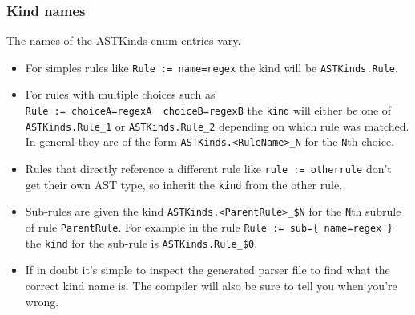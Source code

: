 \subsubsection{Kind names}\label{kind-names}

The names of the ASTKinds enum entries vary.

\begin{itemize}
\item
  For simples rules like
  \texttt{Rule\ :=\ name=\textquotesingle{}regex\textquotesingle{}} the
  kind will be \texttt{ASTKinds.Rule}.
\item
  For rules with multiple choices such as
  \texttt{Rule\ :=\ choiceA=\textquotesingle{}regexA\textquotesingle{}\ \textbar{}\ choiceB=\textquotesingle{}regexB\textquotesingle{}}
  the \texttt{kind} will either be one of \texttt{ASTKinds.Rule\_1} or
  \texttt{ASTKinds.Rule\_2} depending on which rule was matched. In
  general they are of the form
  \texttt{ASTKinds.\textless{}RuleName\textgreater{}\_N} for the
  \texttt{N}th choice.
\item
  Rules that directly reference a different rule like
  \texttt{rule\ :=\ otherrule} don't get their own AST type, so inherit
  the \texttt{kind} from the other rule.
\item
  Sub-rules are given the kind
  \texttt{ASTKinds.\textless{}ParentRule\textgreater{}\_\$N} for the
  \texttt{N}th subrule of rule \texttt{ParentRule}. For example in the
  rule
  \texttt{Rule\ :=\ sub=\{\ name=\textquotesingle{}regex\textquotesingle{}\ \}}
  the \texttt{kind} for the sub-rule is \texttt{ASTKinds.Rule\_\$0}.
\item
  If in doubt it's simple to inspect the generated parser file to find
  what the correct kind name is. The compiler will also be sure to tell
  you when you're wrong.
\end{itemize}
